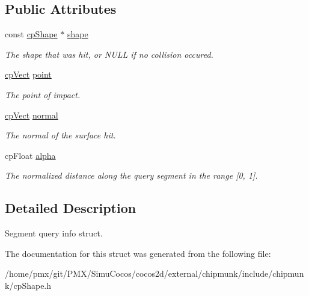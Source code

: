 \subsection*{Public Attributes}
\begin{DoxyCompactItemize}
\item 
\mbox{\label{structcpSegmentQueryInfo_a6f5a007f7f79b2eb59580a53f18a6dee}} 
const \hyperlink{structcpShape}{cp\+Shape} $\ast$ \hyperlink{structcpSegmentQueryInfo_a6f5a007f7f79b2eb59580a53f18a6dee}{shape}
\begin{DoxyCompactList}\small\item\em The shape that was hit, or N\+U\+LL if no collision occured. \end{DoxyCompactList}\item 
\mbox{\label{structcpSegmentQueryInfo_ac18fb70008b01420c06a407e3d95923a}} 
\hyperlink{structcpVect}{cp\+Vect} \hyperlink{structcpSegmentQueryInfo_ac18fb70008b01420c06a407e3d95923a}{point}
\begin{DoxyCompactList}\small\item\em The point of impact. \end{DoxyCompactList}\item 
\mbox{\label{structcpSegmentQueryInfo_a453d113d757becaab1363e80c9a54e76}} 
\hyperlink{structcpVect}{cp\+Vect} \hyperlink{structcpSegmentQueryInfo_a453d113d757becaab1363e80c9a54e76}{normal}
\begin{DoxyCompactList}\small\item\em The normal of the surface hit. \end{DoxyCompactList}\item 
\mbox{\label{structcpSegmentQueryInfo_af5b6ff0d0b32196cf2716e9672604c61}} 
cp\+Float \hyperlink{structcpSegmentQueryInfo_af5b6ff0d0b32196cf2716e9672604c61}{alpha}
\begin{DoxyCompactList}\small\item\em The normalized distance along the query segment in the range \mbox{[}0, 1\mbox{]}. \end{DoxyCompactList}\end{DoxyCompactItemize}


\subsection{Detailed Description}
Segment query info struct. 

The documentation for this struct was generated from the following file\+:\begin{DoxyCompactItemize}
\item 
/home/pmx/git/\+P\+M\+X/\+Simu\+Cocos/cocos2d/external/chipmunk/include/chipmunk/cp\+Shape.\+h\end{DoxyCompactItemize}
